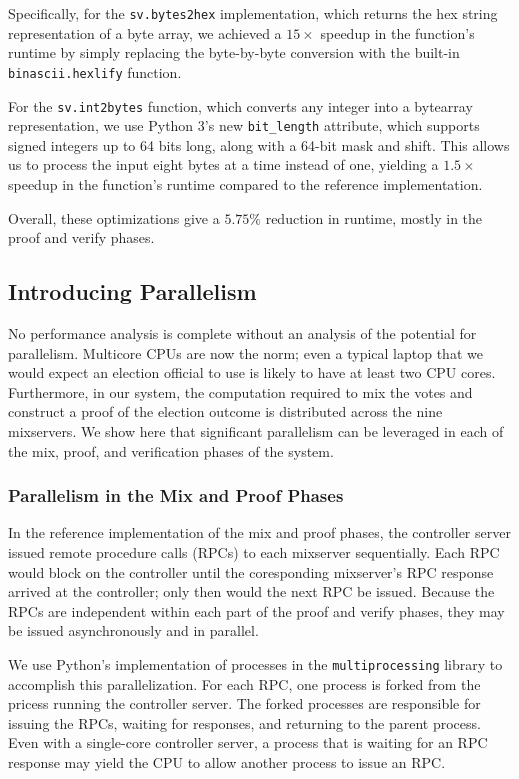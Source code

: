 Specifically, for the \texttt{sv.bytes2hex} implementation, which returns the hex string representation of a byte array, we achieved a $15 \times$ speedup in the function's runtime by simply replacing the byte-by-byte conversion with the built-in \texttt{binascii.hexlify} function.

For the \texttt{sv.int2bytes} function, which converts any integer into a bytearray representation, we use Python 3's new \texttt{bit\_length} attribute, which supports signed integers up to 64 bits long, along with a 64-bit mask and shift. This allows us to process the input eight bytes at a time instead of one, yielding a $1.5 \times$ speedup in the function's runtime compared to the reference implementation.

Overall, these optimizations give a $5.75\%$ reduction in runtime, mostly in the proof and verify phases.

\subsection{Introducing Parallelism} \label{perf:optimizations:parallel}

No performance analysis is complete without an analysis of the potential for parallelism. Multicore CPUs are now the norm; even a typical laptop that we would expect an election official to use is likely to have at least two CPU cores. Furthermore, in our system, the computation required to mix the votes and construct a proof of the election outcome is distributed across the nine mixservers. We show here that significant parallelism can be leveraged in each of the mix, proof, and verification phases of the system.

\subsubsection{Parallelism in the Mix and Proof Phases}

In the reference implementation of the mix and proof phases, the controller server issued remote procedure calls (RPCs) to each mixserver sequentially. Each RPC would block on the controller until the coresponding mixserver's RPC response arrived at the controller; only then would the next RPC be issued. Because the RPCs are independent within each part of the proof and verify phases, they may be issued asynchronously and in parallel.

We use Python's implementation of processes in the \texttt{multiprocessing} library to accomplish this parallelization. For each RPC, one process is forked from the pricess running the controller server. The forked processes are responsible for issuing the RPCs, waiting for responses, and returning to the parent process. Even with a single-core controller server, a process that is waiting for an RPC response may yield the CPU to allow another process to issue an RPC.

